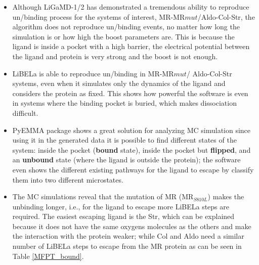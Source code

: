 \documentclass[
  journal=usp, %
  manuscript=final-report,
  year=2023,
  volume=1,
]{cup-journal}
\begin{document}
\begin{itemize}

\item Although LiGaMD-1/2 has demonstrated a tremendous ability to reproduce un/binding process for the systems of interest, MR-MR${mut}$/Aldo-Col-Str, the algorithm does not reproduce un/binding events, no matter how long the simulation is or how high the boost parameters are. This is because the ligand is inside a pocket with a high barrier, the electrical potential between the ligand and protein is very strong and the boost is not enough. 

\item LiBELa is able to reproduce un/binding in MR-MR${mut}$/ Aldo-Col-Str systems, even when it simulates only the dynamics of the ligand and considers the protein as fixed. This shows how powerful the software is even in systems where the binding pocket is buried, which makes dissociation difficult.

\item PyEMMA package shows a great solution for analyzing MC simulation since using it in the generated data it is possible to find different states of the system: inside the pocket (\textbf{bound} state), inside the pocket but \textbf{flipped}, and an \textbf{unbound} state (where the ligand is outside the protein); the software even shows the different existing pathways for the ligand to escape by classify them into two different microstates. 

\item The MC simulations reveal that the mutation of MR (MR$_{S810L}$) makes the unbinding longer, i.e., for the ligand to escape more LiBELa steps are required. The easiest escaping ligand is the Str, which can be explained because it does not have the same oxygens molecules as the others and make the interaction with the protein weaker; while Col and Aldo need a similar number of LiBELa steps to escape from the MR protein as can be seen in Table \ref{MFPT_bound}.    


\end{itemize}
\end{document}
